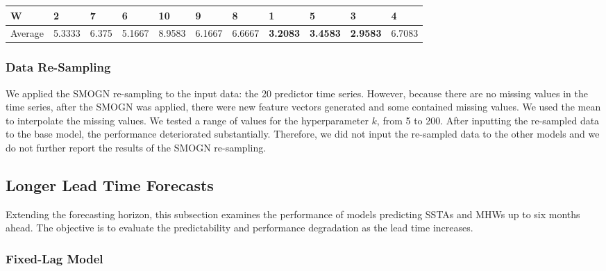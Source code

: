 \documentclass[11pt, a4paper]{article}
\begin{document}
\begin{table}[H]
\begin{tabular}{lllllllllll}
W                             & 2                                        & 7                                & 6                                & 10                                 & 9                                 & 8                               & 1                                 & 5                                   & 3                                   & 4                                   \\ \hline
Average                               & 5.3333                                   & 6.375                            & 5.1667                           & 8.9583                             & 6.1667                            & 6.6667                          & \textbf{3.2083}                   & \textbf{3.4583}                     & \textbf{2.9583}                     & 6.7083
\end{tabular}
\end{table}

\subsubsection{Data Re-Sampling}

We applied the SMOGN re-sampling \citep{branco2017smogn} to the input data: the 20 predictor time series. However, because there are no missing values in the time series, after the SMOGN was applied, there were new feature vectors generated and some contained missing values. We used the mean to interpolate the missing values. We tested a range of values for the hyperparameter $k$, from 5 to 200. After inputting the re-sampled data to the base model, the performance deteriorated substantially. Therefore, we did not input the re-sampled data to the other models and we do not further report the results of the SMOGN re-sampling.

\subsection{Longer Lead Time Forecasts}

Extending the forecasting horizon, this subsection examines the performance of models predicting SSTAs and MHWs up to six months ahead. The objective is to evaluate the predictability and performance degradation as the lead time increases.

\subsubsection{Fixed-Lag Model}
\end{document}
